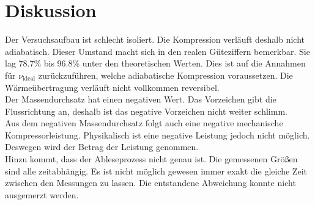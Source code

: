 \section{Diskussion}
\label{sec:Diskussion}

Der Versuchsaufbau ist schlecht isoliert. Die Kompression verläuft deshalb nicht adiabatisch. Dieser Umstand macht sich in 
den realen Güteziffern bemerkbar.
Sie lag 78.7\% bis 96.8\% unter den theoretischen Werten. Dies ist auf die Annahmen für $ν_{\text{ideal}}$ zurückzuführen,
welche adiabatische Kompression voraussetzen. Die Wärmeübertragung verläuft nicht vollkommen reversibel.
\\
Der Massendurchsatz hat einen negativen Wert. Das Vorzeichen gibt die Flussrichtung an, deshalb ist das negative Vorzeichen nicht weiter schlimm.
\\
Aus dem negativen Massendurchsatz folgt auch eine negative mechanische Kompressorleistung. Physikalisch ist eine negative Leistung jedoch nicht möglich. 
Deswegen wird der Betrag der Leistung genommen.
\\
Hinzu kommt, dass der Ableseprozess nicht genau ist.
Die gemessenen Größen sind alle zeitabhängig. Es ist nicht möglich gewesen immer exakt die gleiche Zeit zwischen den Messungen zu lassen.
Die entstandene Abweichung konnte nicht ausgemerzt werden.\\

\newpage
